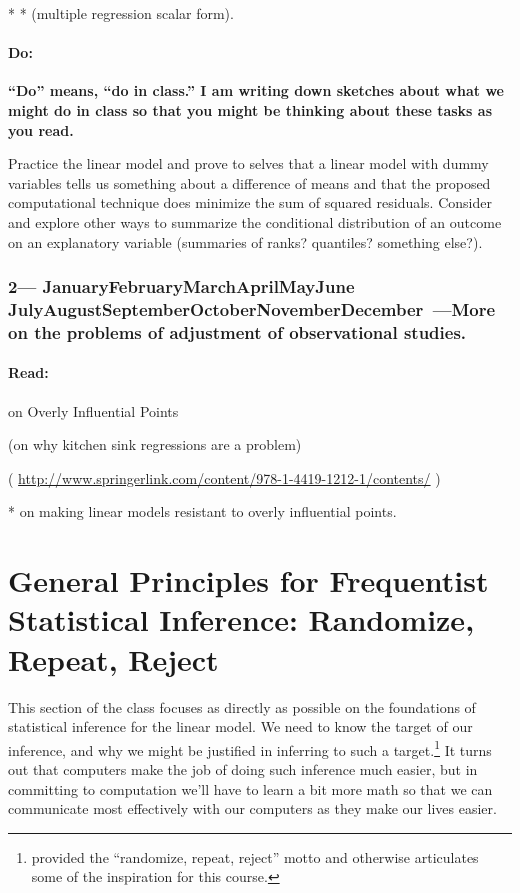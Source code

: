 \documentclass[10pt]{article}
\def\themonth{\ifcase\month\or
  January\or February\or March\or April\or May\or June\or
  July\or August\or September\or October\or November\or December\fi}
\begin{document}
*\citealp[Chapters 1,2,5.1]{fox2008applied} %
*\citealp[Chap 5.2]{fox2008applied} (multiple regression scalar form).


\subsection{Do:} \textbf{``Do'' means, ``do in class.'' I am writing
  down sketches about what we might do in class so that you might be
  thinking about these tasks as you read.}

Practice the linear model and prove to selves that a linear model with
dummy variables tells us something about a difference of means and
that the proposed computational technique does minimize the sum of
squared residuals. Consider and explore other ways to summarize the
conditional distribution of an outcome on an explanatory variable
(summaries of ranks? quantiles? something else?).

\AdvanceDate[7]
\section{2---\themonth~\the\day---More on the problems of adjustment of observational
  studies.} %

\subsection{Read:}
\citealp[Chap 11]{fox2008applied} on Overly Influential Points

\citealp{ache:02} (on why kitchen sink regressions are a problem)

\citealp[Chap 1,3,7,8,9,13]{rosenbaum2010design}  (
\url{http://www.springerlink.com/content/978-1-4419-1212-1/contents/} )

*\citealp[Chap 19]{fox2008applied} on making linear models resistant to overly influential points.


\citet{hansen:2004}

\part{General Principles for Frequentist Statistical Inference:
  Randomize, Repeat, Reject}

This section of the class focuses as directly as possible on the
foundations of statistical inference for the linear model. We need to
know the target of our inference, and why we might be justified in
inferring to such a target.\footnote{\citet{cobb2007introductory}
  provided the ``randomize, repeat, reject'' motto and otherwise
  articulates some of the inspiration for this course.} It turns out
that computers make the job of doing such inference much easier, but
in committing to computation we'll have to learn a bit more math so
that we can communicate most effectively with our computers as they
make our lives easier.
\end{document}
